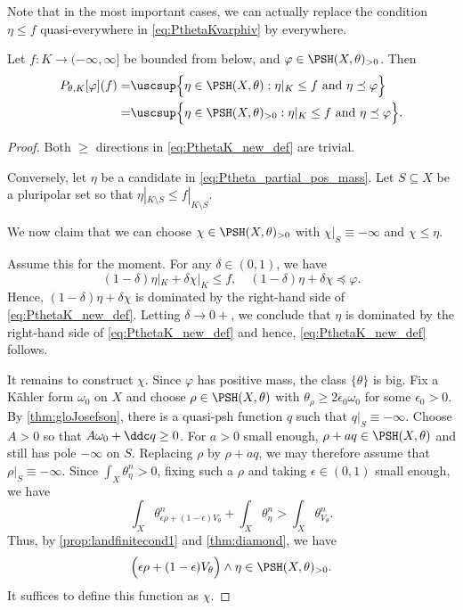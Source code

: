 Note that in the most important cases, we can actually replace the condition $\eta\leq f$ quasi-everywhere in \eqref{eq:PthetaKvarphiv} by everywhere.
\begin{lemma}\label{lma:PKoutsidepps}
    Let $f\colon K\rightarrow (-\infty,\infty]$ be bounded from below, and $\varphi\in \PSH(X,\theta)_{>0}$.
    Then
    \begin{equation}\label{eq:PthetaK_new_def}
        \begin{split}
    P_{\theta,K}[\varphi](f)=&\uscsup \Bigl\{ \eta \in \PSH(X,\theta): \eta|_K \leq f  \textup{ and } \eta\preceq \varphi\Bigr\}\\
    =& \uscsup \Bigl\{ \eta \in \PSH(X,\theta)_{>0}: \eta|_K \leq f  \textup{ and } \eta\preceq \varphi\Bigr\}.
        \end{split}
    \end{equation}
\end{lemma}
\begin{proof}
Both $\geq$ directions in \eqref{eq:PthetaK_new_def} are trivial.

Conversely, let $\eta$ be a candidate in \eqref{eq:Ptheta_partial_pos_mass}.
Let $S\subseteq X$ be a pluripolar set so that $\eta|_{K\setminus S}\leq f|_{K\setminus S}$.

We now claim that we can choose $\chi\in \PSH(X,\theta)_{>0}$ with $\chi|_S\equiv -\infty$ and $\chi\leq \eta$.

Assume this for the moment. For any $\delta\in (0,1)$, we have
\[
(1-\delta)\eta|_K+\delta \chi|_K\leq f,\quad (1-\delta)\eta+\delta \chi\preceq \varphi.
\]
Hence, $(1-\delta)\eta+\delta \chi$ is dominated by the right-hand side of \eqref{eq:PthetaK_new_def}.
Letting $\delta \to 0+$, we conclude that $\eta$ is dominated by the right-hand side of \eqref{eq:PthetaK_new_def} and hence, \eqref{eq:PthetaK_new_def} follows.

    It remains to construct $\chi$.
    Since $\varphi$ has positive mass, the class $\{\theta\}$ is big. Fix a K\"ahler form $\omega_0$ on $X$ and choose $\rho\in \PSH(X,\theta)$ with $\theta_{\rho}\geq 2\epsilon_0\omega_0$ for some $\epsilon_0>0$. By \cref{thm:gloJosefson}, there is a quasi-psh function $q$ such that $q|_S\equiv -\infty$. Choose $A>0$ so that $A\omega_0+\ddc q\geq 0$. For $a>0$ small enough, $\rho+aq\in \PSH(X,\theta)$ and still has pole $-\infty$ on $S$. Replacing $\rho$ by $\rho+aq$, we may therefore assume that $\rho|_S\equiv -\infty$.
    Since $\int_X \theta_{\eta}^n>0$, fixing such a $\rho$ and taking $\epsilon\in (0,1)$ small enough, we have
    \[
    \int_X \theta^n_{\epsilon \rho+(1-\epsilon)V_{\theta}}+\int_X \theta_{\eta}^n>\int_X \theta_{V_{\theta}}^n.
    \]
    Thus, by \cref{prop:landfinitecond1} and \cref{thm:diamond}, we have
    \[
    \Bigl(\epsilon \rho+(1-\epsilon)V_{\theta}\Bigr) \land \eta \in \PSH(X,\theta)_{>0}.
    \]
    It suffices to define this function as $\chi$.
\end{proof}

